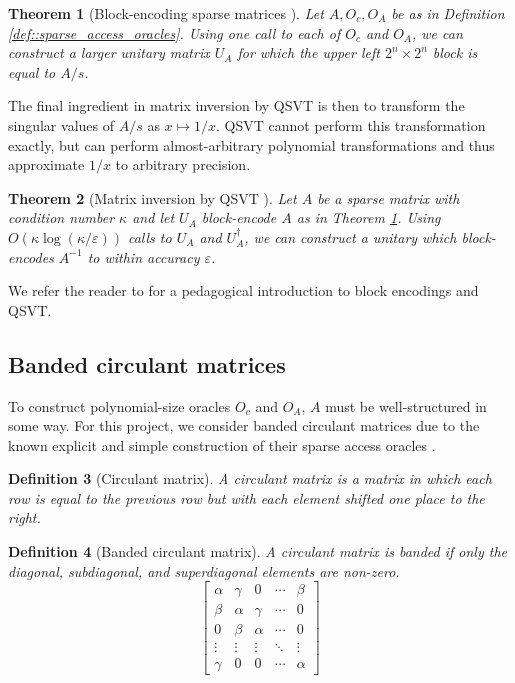 \documentclass[10pt, twocolumn]{article}
\newtheorem{theorem}{Theorem}[section]
\newtheorem{definition}[theorem]{Definition}
\begin{document}
\begin{theorem}[Block-encoding sparse matrices \cite{gilyen2019quantum, camps2203explicit}]
	\label{thm:block_encoding_sparse_matrices}
	Let $A, O_c, O_A$ be as in Definition \ref{def::sparse_access_oracles}. Using one call to each of $O_c$ and $O_A$, we can construct a larger unitary matrix $U_A$ for which the upper left $2^n \times 2^n$ block is equal to $A/s$.
\end{theorem}

The final ingredient in matrix inversion by QSVT is then to transform the singular values of $A/s$ as $x \mapsto 1/x$. QSVT cannot perform this transformation exactly, but can perform almost-arbitrary polynomial transformations \cite{sunderhauf2023generalized} and thus approximate $1/x$ to arbitrary precision.

\begin{theorem}[Matrix inversion by QSVT \cite{gilyen2019quantum}]
	Let $A$ be a sparse matrix with condition number $\kappa$ and let $U_A$ block-encode $A$ as in Theorem \ref{thm:block_encoding_sparse_matrices}. Using $O(\kappa \log(\kappa / \varepsilon))$ calls to $U_A$ and $U_A^\dag$, we can construct a unitary which block-encodes $A^{-1}$ to within accuracy $\varepsilon$.
\end{theorem}

We refer the reader to \cite{martyn2021grand} for a pedagogical introduction to block encodings and QSVT.

\subsection{Banded circulant matrices}

To construct polynomial-size oracles $O_c$ and $O_A$, $A$ must be well-structured in some way. For this project, we consider banded circulant matrices due to the known explicit and simple construction of their sparse access oracles \cite{camps2203explicit}.

\begin{definition}[Circulant matrix]
	A circulant matrix is a matrix in which each row is equal to the previous row but with each element shifted one place to the right.
\end{definition}

\begin{definition}[Banded circulant matrix]
	A circulant matrix is banded if only the diagonal, subdiagonal, and superdiagonal elements are non-zero.
	\[
		\begin{bmatrix}
			\alpha & \gamma & 0 & \cdots & \beta \\
			\beta & \alpha & \gamma & \cdots & 0 \\
			0 & \beta & \alpha & \cdots & 0 \\
			\vdots & \vdots & \vdots & \ddots & \vdots \\
			\gamma & 0 & 0 & \cdots & \alpha
		\end{bmatrix}
	\]
\end{definition}

\newpage

\printbibliography
\end{document}
